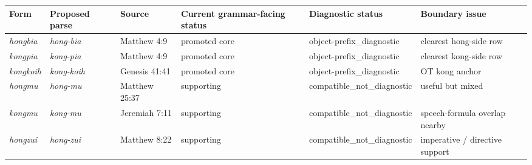 \documentclass[
  11pt,
  a4paper,
]{article}
\newcounter{none} %
\newcommand{\tdim}[1]{\textit{#1}}
\begin{document}
{\def\LTcaptype{none} %
\begin{longtable}[]{@{}
  >{\raggedright\arraybackslash}p{}
  >{\raggedright\arraybackslash}p{}
  >{\raggedright\arraybackslash}p{}
  >{\raggedright\arraybackslash}p{}
  >{\raggedright\arraybackslash}p{}
  >{\raggedright\arraybackslash}p{}@{}}
\toprule\noalign{}
\begin{minipage}[b]{\linewidth}\raggedright
Form
\end{minipage} & \begin{minipage}[b]{\linewidth}\raggedright
Proposed parse
\end{minipage} & \begin{minipage}[b]{\linewidth}\raggedright
Source
\end{minipage} & \begin{minipage}[b]{\linewidth}\raggedright
Current grammar-facing status
\end{minipage} & \begin{minipage}[b]{\linewidth}\raggedright
Diagnostic status
\end{minipage} & \begin{minipage}[b]{\linewidth}\raggedright
Boundary issue
\end{minipage} \\
\midrule\noalign{}
\endhead
\bottomrule\noalign{}
\endlastfoot
\tdim{hongbia} & \tdim{hong-bia} & Matthew 4:9 & promoted core &
object-prefix\_diagnostic & clearest hong-side row \\
\tdim{kongpia} & \tdim{kong-pia} & Matthew 4:9 & promoted core &
object-prefix\_diagnostic & clearest kong-side row \\
\tdim{kongkoih} & \tdim{kong-koih} & Genesis 41:41 & promoted core &
object-prefix\_diagnostic & OT kong anchor \\
\tdim{hongmu} & \tdim{hong-mu} & Matthew 25:37 & supporting &
compatible\_not\_diagnostic & useful but mixed \\
\tdim{kongmu} & \tdim{kong-mu} & Jeremiah 7:11 & supporting &
compatible\_not\_diagnostic & speech-formula overlap nearby \\
\tdim{hongzui} & \tdim{hong-zui} & Matthew 8:22 & supporting &
compatible\_not\_diagnostic & imperative / directive support \\

\end{longtable}}
\end{document}
